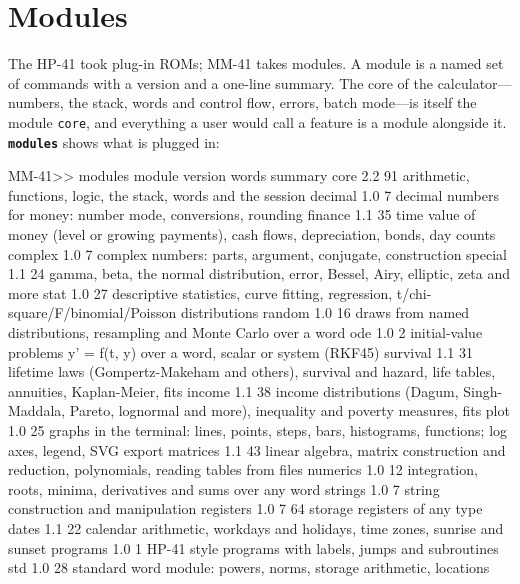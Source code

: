 \documentclass[11pt,letterpaper]{article}
\newcommand{\code}[1]{\texttt{#1}}
\newcommand{\cmd}[1]{\texttt{\textbf{#1}}}
\begin{document}
\section{Modules}
\label{sec:modules}

The HP-41 took plug-in ROMs; MM-41 takes modules. A module is a named set of commands with a version and a one-line summary. The core of the calculator---numbers, the stack, words and control flow, errors, batch mode---is itself the module \code{core}, and everything a user would call a feature is a module alongside it. \cmd{modules} shows what is plugged in:

\begin{rpn}
MM-41>> modules
module       version  words  summary
core         2.2         91  arithmetic, functions, logic, the stack, words and the session
decimal      1.0          7  decimal numbers for money: number mode, conversions, rounding
finance      1.1         35  time value of money (level or growing payments), cash flows, depreciation, bonds, day counts
complex      1.0          7  complex numbers: parts, argument, conjugate, construction
special      1.1         24  gamma, beta, the normal distribution, error, Bessel, Airy, elliptic, zeta and more
stat         1.0         27  descriptive statistics, curve fitting, regression, t/chi-square/F/binomial/Poisson distributions
random       1.0         16  draws from named distributions, resampling and Monte Carlo over a word
ode          1.0          2  initial-value problems y' = f(t, y) over a word, scalar or system (RKF45)
survival     1.1         31  lifetime laws (Gompertz-Makeham and others), survival and hazard, life tables, annuities, Kaplan-Meier, fits
income       1.1         38  income distributions (Dagum, Singh-Maddala, Pareto, lognormal and more), inequality and poverty measures, fits
plot         1.0         25  graphs in the terminal: lines, points, steps, bars, histograms, functions; log axes, legend, SVG export
matrices     1.1         43  linear algebra, matrix construction and reduction, polynomials, reading tables from files
numerics     1.0         12  integration, roots, minima, derivatives and sums over any word
strings      1.0          7  string construction and manipulation
registers    1.0          7  64 storage registers of any type
dates        1.1         22  calendar arithmetic, workdays and holidays, time zones, sunrise and sunset
programs     1.0          1  HP-41 style programs with labels, jumps and subroutines
std          1.0         28  standard word module: powers, norms, storage arithmetic, locations
\end{rpn}
\end{document}
